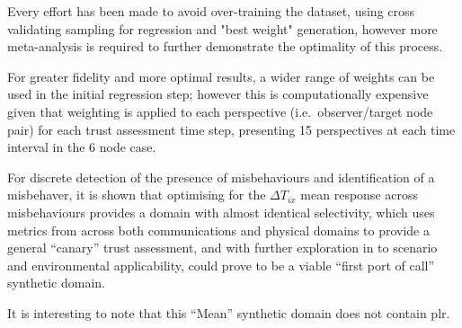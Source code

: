 Every effort has been made to avoid over-training the dataset, using cross validating sampling for regression and "best weight" generation, however more meta-analysis is required to further demonstrate the optimality of this process.

For greater fidelity and more optimal results, a wider range of weights can be used in the initial regression step; however this is computationally expensive given that weighting is applied to each perspective (i.e.\ observer/target node pair) for each trust assessment time step, presenting 15 perspectives at each time interval in the 6 node case.

For discrete detection of the presence of misbehaviours and identification of a misbehaver, it is shown that optimising for the $\Delta T_{ix}$ mean response across misbehaviours provides a domain with almost identical selectivity, which uses metrics from across both communications and physical domains to provide a general ``canary'' trust assessment, and with further exploration in to scenario and environmental applicability, could prove to be a viable ``first port of call'' synthetic domain.

It is interesting to note that this ``Mean'' synthetic domain does not contain \gls{plr}.


